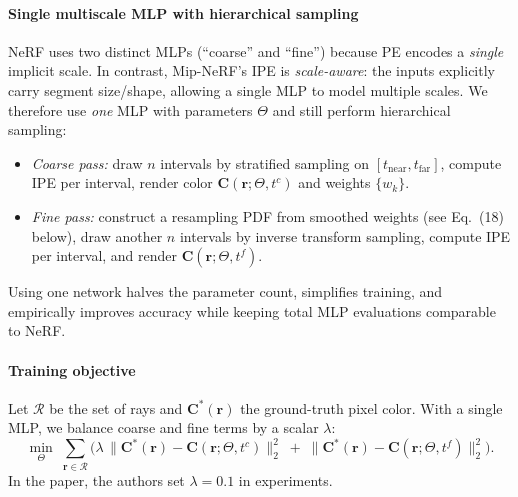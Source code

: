 \begin{enrichment}
\begin{enrichment}
    \paragraph{Single multiscale MLP with hierarchical sampling}
    NeRF uses two distinct MLPs (``coarse'' and ``fine'') because PE encodes a \emph{single} implicit scale. In contrast, Mip-NeRF’s IPE is \emph{scale-aware}: the inputs explicitly carry segment size/shape, allowing a single MLP to model multiple scales. We therefore use \emph{one} MLP with parameters $\Theta$ and still perform hierarchical sampling:
    \begin{itemize}
        \item \emph{Coarse pass:} draw $n$ intervals by stratified sampling on $[t_{\mathrm{near}}, t_{\mathrm{far}}]$, compute IPE per interval, render color $\mathbf{C}(\mathbf{r};\Theta, t^c)$ and weights $\{w_k\}$.
        \item \emph{Fine pass:} construct a resampling PDF from smoothed weights (see Eq.~(18) below), draw another $n$ intervals by inverse transform sampling, compute IPE per interval, and render $\mathbf{C}(\mathbf{r};\Theta, t^f)$.
    \end{itemize}
    Using one network halves the parameter count, simplifies training, and empirically improves accuracy while keeping total MLP evaluations comparable to NeRF.
    
    \paragraph{Training objective}
    Let $\mathcal{R}$ be the set of rays and $\mathbf{C}^\ast(\mathbf{r})$ the ground-truth pixel color. With a single MLP, we balance coarse and fine terms by a scalar $\lambda$:
    \begin{equation}
        \min_{\Theta}\;
        \sum_{\mathbf{r}\in\mathcal{R}}
        \Big(
        \lambda\,\big\|\mathbf{C}^\ast(\mathbf{r}) - \mathbf{C}(\mathbf{r};\Theta, t^{c})\big\|_2^2
        \;+\;
        \big\|\mathbf{C}^\ast(\mathbf{r}) - \mathbf{C}(\mathbf{r};\Theta, t^{f})\big\|_2^2
        \Big).
        \label{eq:chapter23_mipnerf_objective}
    \end{equation}
    In the paper, the authors set $\lambda=0.1$ in experiments.
    

\end{enrichment}
\end{enrichment}
